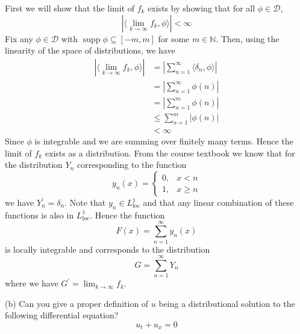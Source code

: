 \documentclass{article}
\DeclareMathOperator\supp{supp}
\begin{document}
First we will show that the limit of $f_k$ exists by showing that for
all $\phi \in \mathcal{D}$,
%
\begin{equation*}
    \left| \langle \lim_{k \to \infty} f_k, \phi \rangle \right| < \infty
\end{equation*}
%
Fix any $\phi \in \mathcal{D}$ with $\supp \phi \subseteq [-m, m]$
for some $m \in \mathbb{N}$. Then, using the linearity of the space of
distributions, we have
%
\begin{align*}
    \left| \langle \lim_{k \to \infty} f_k, \phi \rangle \right|
        &= \left| \sum_{n=1}^\infty \langle \delta_n, \phi \rangle \right| \\
        &= \left| \sum_{n=1}^\infty \phi(n) \right| \\
        &= \left| \sum_{n=1}^m \phi(n) \right| \\
        &\leq \sum_{n=1}^m |\phi(n)| \\
        &< \infty
\end{align*}
%
Since $\phi$ is integrable and we are summing over finitely many terms.
Hence the limit of $f_k$ exists as a distribution. From the course
textbook we know that for the distribution $Y_n$ corresponding to the
function
%
\begin{equation*}
    y_n(x) =
        \begin{cases}
            0, & x < n \\
            1, & x \geq n
        \end{cases}
\end{equation*}
%
we have $Y_n^\prime = \delta_n$. Note that $y_n \in L_{\text{loc}}^1$
and that any linear combination of these functions is also in
$L_{\text{loc}}^1$. Hence the function
%
\begin{equation*}
    F(x) = \sum_{n=1}^\infty y_n(x)
\end{equation*}
%
is locally integrable and corresponds to the distribution
%
\begin{equation*}
    G = \sum_{n=1}^\infty Y_n
\end{equation*}
%
where we have $G^\prime = \lim_{k \to \infty} f_k$.

\vspace{5mm}

(b) Can you give a proper definition of $u$ being a distributional
solution to the following differential equation?
%
\begin{equation}
    u_t + u_x = 0
    \label{eq:q2pb}
\end{equation}
\end{document}
